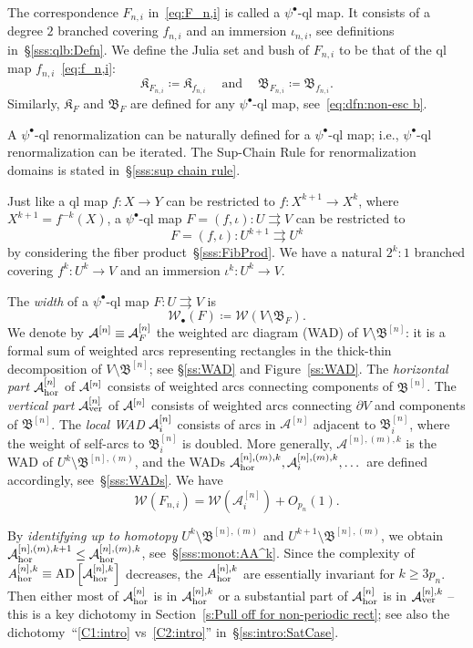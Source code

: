 \documentclass{amsart}
\newcommand{\filled}{{\mathfrak K }}
\newcommand{\AD}{{\operatorname{AD}}}
\newcommand{\bush}{{\mathfrak B }}
\newcommand{\bbush}{{\boldsymbol {\mathfrak B} }}
\renewcommand{\sp}{{\ \ }}
\newcommand{\1}{{\mathbb 1 }}
\newcommand{\Width}{{\mathcal W}}
\renewcommand{\AA}{{\mathcal A}}
\begin{document}
The correspondence $F_{n,i}$ in~\eqref{eq:F_n,i} is called a $\psi^\bullet$-ql map. It consists of a degree $2$ branched covering $f_{n,i}$ and an immersion $\iota_{n,i}$, see definitions in~\S\ref{sss:qlb:Defn}. We define the Julia set and bush of $F_{n,i}$ to be that of the ql map $f_{n,i}$~\eqref{eq:f_n,i}:
\[ \filled_{F_{n,i}}\coloneqq \filled_{f_{n,i}}\sp\sp\text{ and }\sp\sp \bush_{F_{n,i}}\coloneqq \bush_{f_{n,i}} .\]
Similarly, $\filled_F$ and  $\bush_F$ are defined for any $\psi^\bullet$-ql map, see~\eqref{eq:dfn:non-esc b}.  


A $\psi^\bullet$-ql renormalization can be naturally defined for a $\psi^\bullet$-ql map; i.e., $\psi^\bullet$-ql renormalization can be iterated. The Sup-Chain Rule for renormalization domains is stated in~\S\ref{sss:sup chain rule}.

Just like a ql map $f\colon X\to Y$ can be restricted to $f\colon X^{k+1}\to X^k$, where $X^{k+1}=f^{-k}(X)$, a $\psi^\bullet$-ql map $F=(f,\iota )\colon U\rightrightarrows V$
can be restricted to \[F=(f,\iota )\colon U^{k+1}\rightrightarrows U^{k}\] by considering the fiber product~\S\ref{sss:FibProd}. We have a natural $2^{k}:1$ branched covering $f^k\colon U^k\to V$ and an immersion $\iota^k\colon U^k\to V$.




 The \emph{width} of a $\psi^\bullet$-ql map $F\colon U\rightrightarrows V$ is 
\[\Width_\bullet(F)\coloneqq \Width(V\setminus \bush_F).\] 
We denote by ${\mathcal A}^{[n]}\equiv {\mathcal A}^{[n]}_F$ the weighted arc diagram (WAD) of $V\setminus \bbush^{[n]}$: it is a formal sum of weighted arcs representing rectangles in the thick-thin decomposition of $V\setminus \bbush^{[n]}$; see \S\ref{ss:WAD} and Figure~\ref{ss:WAD}. The \emph{horizontal part}  ${\mathcal A}^{[n]}_{\mathrm {hor}}$ of ${\mathcal A}^{[n]}$ consists of weighted arcs connecting components of $\bbush^{[n]}$.  The \emph{vertical part} ${\mathcal A}^{[n]}_{\mathrm {ver}}$ of ${\mathcal A}^{[n]}$ consists of weighted arcs connecting $\partial V$ and components of $\bbush^{[n]}$. The \emph{local WAD} ${\mathcal A}^{[n]}_i$ consists of arcs in $\AA^{[n]}$ adjacent to $\bush^{[n]}_i$, where the weight of self-arcs to $\bush^{[n]}_i$ is doubled. More generally, $\AA^{[n],(m),k}$ is the WAD of $U^k\setminus \bbush^{[n],(m)}$, and 
the WADs $\AA^{[n],(m),k}_\hor, \AA^{[n],(m),k}_i,\dots$ are defined accordingly, see~\S\ref{sss:WADs}.  We have 
\[\Width(F_{n,i})=\Width\left(\AA^{[n]}_i\right)+O_{p_n}(1).\]



 
By \emph{identifying up to homotopy} $U^k\setminus \bbush^{[n],(m)}$ and $U^{k+1}\setminus \bbush^{[n],(m)}$, we obtain $\AA^{[n],(m),k+1}_\hor\le\AA^{[n],(m),k}_\hor$, see~\S\ref{sss:monot:AA^k}. Since the complexity of $A^{[n],k}_\hor\equiv\AD\left[\AA^{[n],k}_{\hor}\right]$ decreases, the $A^{[n],k}_{{\mathrm {hor}}}$ are essentially invariant for $k\ge 3 p_n$. Then either most of $\AA^{[n]}_\hor$ is in $\AA^{[n],k}_\hor$ or a substantial part of $\AA^{[n]}_\hor$ is in $\AA^{[n],k}_\ver$ -- this is a key dichotomy in Section~\ref{s:Pull off for non-periodic rect}; see also the dichotomy~``\ref{C1:intro} vs~\ref{C2:intro}'' in~\S\ref{ss:intro:SatCase}.   
\end{document}
